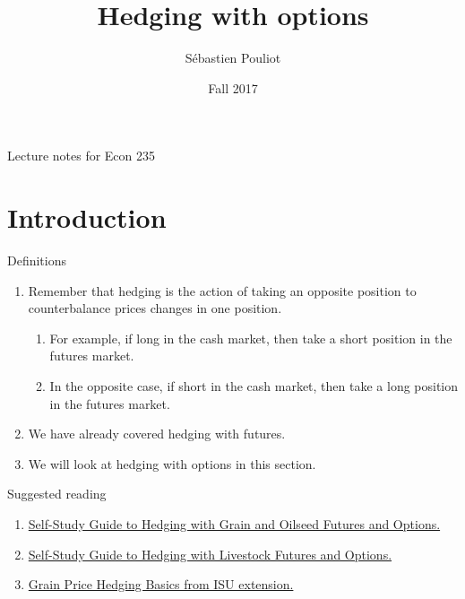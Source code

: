 \documentclass[table,xcolor=pdftex,dvipsnames, handout]{beamer}\usepackage[]{graphicx}\usepackage[]{color}
\title[Hedging with options]{Hedging with options}
\author[Pouliot]{S\'{e}bastien Pouliot}
\institute{Iowa State University}
\date{Fall 2017}
\begin{document}

\begin{frame}
\titlepage
\vspace{-0.4in}
\begin{center}
Lecture notes for Econ 235\\
\end{center}
\end{frame}

\section{Introduction}

\begin{frame}{Definitions}
\begin{enumerate}[label=\textbullet]
  \item Remember that hedging is the action of taking an opposite position to counterbalance prices changes in one position.
    \begin{enumerate}[label=-]
         \item For example, if long in the cash market, then take a short position in the futures market.
         \item In the opposite case, if short in the cash market, then take a long position in the futures market.
    \end{enumerate}
  \item We have already covered hedging with futures.
  \item We will look at hedging with options in this section.
\end{enumerate}
\end{frame}


\begin{frame}{Suggested reading}
\begin{enumerate}[label=\textbullet]
  \item \href{http://www.cmegroup.com/trading/agricultural/self-study-guide-to-hedging-with-grain-and-oilseed-futures-and-options.html}{Self-Study Guide to Hedging with Grain and Oilseed Futures and Options.}
    \item \href{http://www.cmegroup.com/trading/agricultural/self-study-guide-hedging-livestock-futures-options.html}{Self-Study Guide to Hedging with Livestock Futures and Options.}
  \item \href{http://www.extension.iastate.edu/agdm/crops/html/a2-60.html}{Grain Price Hedging Basics from ISU extension.}
\end{enumerate}
\end{frame}
\end{document}
